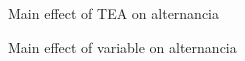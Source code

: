 \documentclass{article}
\begin{document}
\begin{figure}[H]
  \caption{Main effect of TEA on alternancia}
  \noindent{}
  \centering
\end{figure}

\begin{figure}[H]
  \caption{Main effect of variable on alternancia}
  \noindent{}
  \centering
\end{figure}
\end{document}
